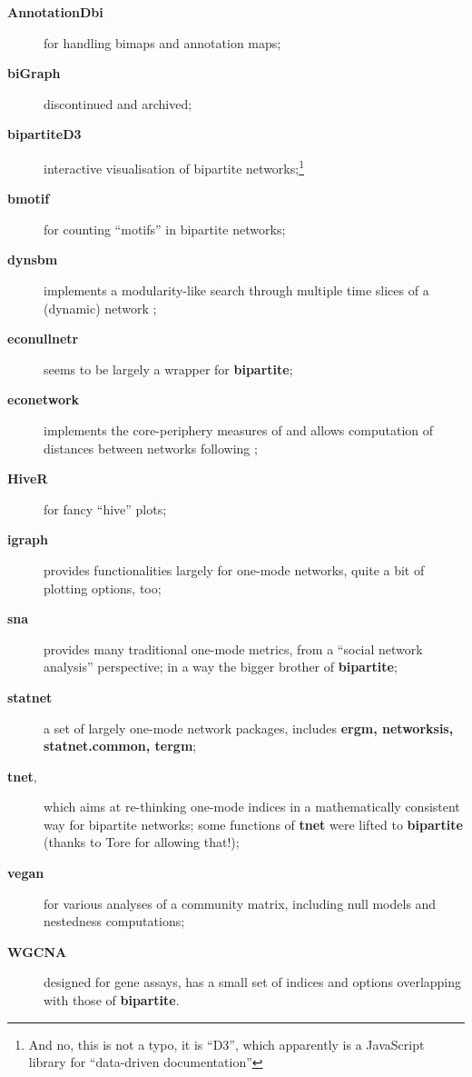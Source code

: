 \documentclass[a4paper, 11pt]{article}\usepackage[]{graphicx}\usepackage[]{color}
\newcommand{\package}[1]{\textbf{#1}}
\begin{document}
\begin{description}
\item[\package{AnnotationDbi}] for handling bimaps and annotation maps;
\item[\package{biGraph}] discontinued and archived;
\item[\package{bipartiteD3}] interactive visualisation of bipartite networks;\footnote{And no, this is not a typo, it is ``D3'', which apparently is a JavaScript library for ``data-driven documentation''}
\item[\package{bmotif}] for counting ``motifs'' in bipartite networks;
\item[\package{dynsbm}] implements a modularity-like search through multiple time slices of a (dynamic) network \citep[``dynamic stochastic block model''][]{Miele2017};
\item[\package{econullnetr}] seems to be largely a wrapper for \package{bipartite};
\item[\package{econetwork}] implements the core-periphery measures of \citet{MartinGonzalez2020} and allows computation of distances between networks following \citet{Ohlmann2019};
\item[\package{HiveR}] for fancy ``hive'' plots;
\item[\package{igraph}] provides functionalities largely for one-mode networks, quite a bit of plotting options, too;
\item[\package{sna}] provides many traditional one-mode metrics, from a ``social network analysis'' perspective; in a way the bigger brother of \package{bipartite};
\item[\package{statnet}] a set of largely one-mode network packages, includes \package{ergm, networksis, statnet.common, tergm};
\item[\package{tnet},] which aims at re-thinking one-mode indices in a mathematically consistent way for bipartite networks; some functions of \package{tnet} were lifted to \package{bipartite} (thanks to Tore for allowing that!);
\item[\package{vegan}] for various analyses of a community matrix, including null models and nestedness computations;
\item[\package{WGCNA}] designed for gene assays, has a small set of indices and options overlapping with those of \package{bipartite}.
\end{description}
\end{document}
